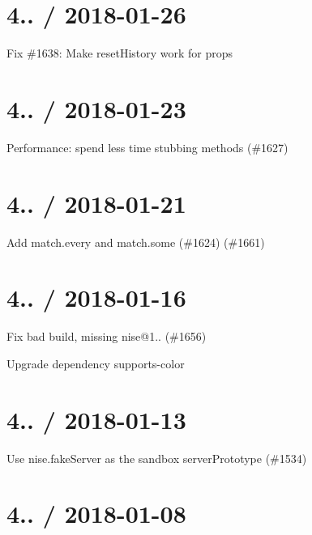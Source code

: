 \section*{4.. / 2018-\/01-\/26 }


\begin{DoxyItemize}
\item Fix \#1638\+: Make reset\+History work for props
\end{DoxyItemize}

\section*{4.. / 2018-\/01-\/23 }


\begin{DoxyItemize}
\item Performance\+: spend less time stubbing methods (\#1627)
\end{DoxyItemize}

\section*{4.. / 2018-\/01-\/21 }


\begin{DoxyItemize}
\item Add match.\+every and match.\+some (\#1624) (\#1661)
\end{DoxyItemize}

\section*{4.. / 2018-\/01-\/16 }


\begin{DoxyItemize}
\item Fix bad build, missing nise@1.. (\#1656)
\item Upgrade dependency supports-\/color
\end{DoxyItemize}

\section*{4.. / 2018-\/01-\/13 }


\begin{DoxyItemize}
\item Use nise.\+fake\+Server as the sandbox server\+Prototype (\#1534)
\end{DoxyItemize}

\section*{4.. / 2018-\/01-\/08 }


